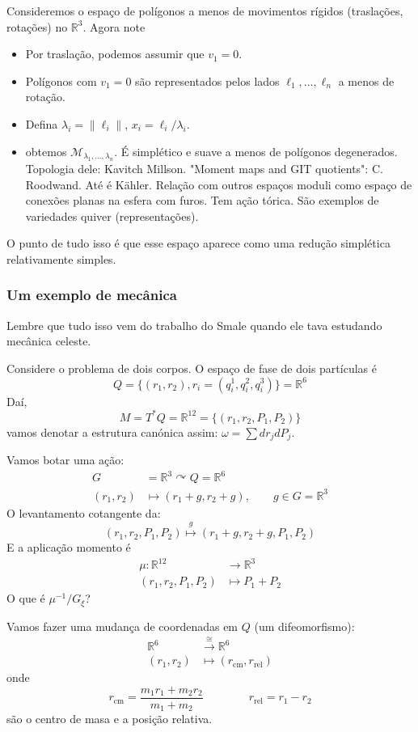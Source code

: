Consideremos o espaço de polígonos a menos de movimentos rígidos (traslações, rotações) no $\mathbb{R}^{3}$. Agora note
\begin{itemize}
\item Por traslação, podemos assumir que $v_1=0$.
\item Polígonos com $v_1=0$ são representados pelos lados $\ell_1,\ldots,\ell_n$ a menos de rotação.
\item Defina $\lambda_i=\|\ell_i\|$, $x_i=\ell_i/\lambda_i$.
\item obtemos $\mathcal{M}_{\lambda_1,\ldots,\lambda_n}$. É simplético e suave a menos de polígonos degenerados. Topologia dele: Kavitch Millson. "Moment maps and GIT quotients": C. Roodwand. Até é Kähler. Relação com outros espaços moduli como espaço de conexões planas na esfera com furos. Tem ação tórica. São exemplos de variedades quiver (representações).
\end{itemize}

O punto de tudo isso é que esse espaço aparece como uma redução simplética relativamente simples.

\subsubsection{Um exemplo de mecânica}

Lembre que tudo isso vem do trabalho do Smale quando ele tava estudando mecânica celeste.

Considere o problema de dois corpos. O espaço de fase de dois partículas é
\[Q=\{(r_1,r_2),r_i=(q_i^1,q_i^2,q_i^3)\} =\mathbb{R}^6\]
Daí,
\[M=T^* Q=\mathbb{R}^{12}=\{(r_1,r_2,P_1,P_2)\}\]
vamos denotar a estrutura canónica assim: $\omega=\sum dr_jdP_j$.

Vamos botar uma ação:
\begin{align*}
	G&=\mathbb{R}^{3}\curvearrowright Q=\mathbb{R}^{6}\\
	(r_1,r_2)&\longmapsto(r_1+g,r_2+g),\qquad g\in G=\mathbb{R}^{3}
\end{align*}
O levantamento cotangente da:
\[(r_1,r_2,P_1,P_2) \overset{g}{\mapsto }(r_1+g,r_2+g,P_1,P_2)\]
E a aplicação momento é
\begin{align*}
	\mu: \mathbb{R}^{12}  &\longrightarrow \mathbb{R}^{3} \\
	(r_1,r_2,P_1,P_2) &\longmapsto P_1+P_2
\end{align*}
O que é $\mu^{-1}/G_\xi$?

Vamos fazer uma mudança de coordenadas em $Q$ (um difeomorfismo):
\begin{align*}
	\mathbb{R}^{6} &\overset{\operatorname{\cong }}{\longrightarrow} \mathbb{R}^{6} \\
	(r_1,r_2) &\longmapsto (r_{\operatorname{cm}},r_{\operatorname{rel}})
\end{align*}
onde
\[r_{\operatorname{cm}}=\frac{m_1r_1+m_2r_2}{m_1+m_2}\qquad \qquad r_{\operatorname{rel}}=r_1-r_2\]
são o centro de masa e a posição relativa.

